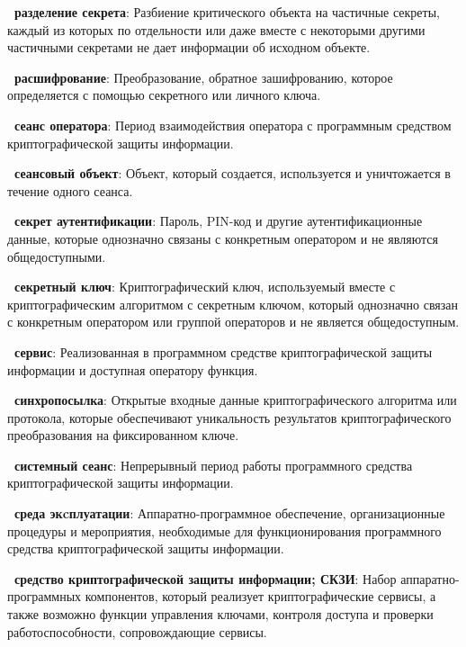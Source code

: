 {\bf \thedefctr~разделение секрета}:
Разбиение критического объекта на частичные секреты, 
каждый из которых по отдельности или даже вместе с некоторыми
другими частичными секретами не дает информации об исходном объекте.

{\bf \thedefctr~расшифрование}:
Преобразование, обратное зашифрованию, которое определяется с помощью
секретного или личного ключа.


{\bf \thedefctr~сеанс оператора}:
Период взаимодействия оператора с программным средством криптографической
защиты информации.

{\bf \thedefctr~сеансовый объект}:
Объект, который создается, 
используется и уничтожается в течение одного сеанса.

{\bf \thedefctr~секрет аутентификации}:
Пароль, PIN-код и другие аутентификационные данные, 
которые однозначно связаны с конкретным оператором 
и не являются общедоступными.

{\bf \thedefctr~секретный ключ}:
Криптографический ключ, используемый
вместе с криптографическим алгоритмом с секретным ключом, 
который однозначно связан с конкретным оператором 
или группой операторов и не является общедоступным.


{\bf \thedefctr~сервис}:
Реализованная в программном средстве криптографической защиты информации 
и доступная оператору функция.

{\bf \thedefctr~синхропосылка}:
Открытые входные данные криптографического алгоритма или протокола,
которые обеспечивают уникальность результатов 
криптографического преобразования на фиксированном ключе.


{\bf \thedefctr~системный сеанс}:
Непрерывный период работы программного средства криптографической 
защиты информации.

{\bf \thedefctr~среда экcплуатации}:
Аппаратно-программное обеспечение, 
организационные процедуры и мероприятия, 
необходимые для функционирования 
программного средства криптографической защиты информации.

{\bf \thedefctr~средство криптографической защиты информации; СКЗИ}:
Набор аппаратно-программных компонентов, который реализует
криптографические сервисы, а также возможно функции управления ключами,
контроля доступа и проверки работоспособности, сопровождающие сервисы.


